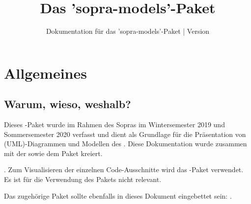 \documentclass{sopra-base}
\title{Das 'sopra-models'-Paket}
\subtitle[Dokumentation für das 'sopra-models'-Paket]{Dokumentation für das 'sopra-models'-Paket | Version \thesomversion}
\begin{document}
    \maketitle%
%
%

%
%
%
%

\section{Allgemeines}
\subsection{Warum, wieso, weshalb?}
    Dieses \LaTeXe-Paket wurde im Rahmen des Sopras im
    Wintersemester 2019 und Sommersemester 2020 verfasst und dient als
    Grundlage für die Präsentation von (UML)-Diagrammen und Modellen
    des . Diese Dokumentation wurde zusammen mit der
     sowie dem Paket  kreiert.\par
    .\newline
    Zum Visualisieren der einzelnen Code-Ausschnitte wird das
    -Paket verwendet. Es ist für die Verwendung des Pakets nicht relevant.\par
    Das zugehörige Paket sollte ebenfalls in dieses Dokument eingebettet sein: .
\end{document}
